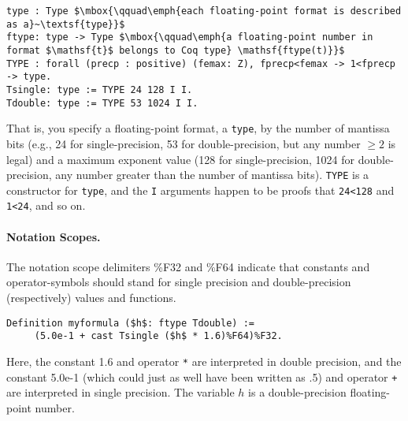 \documentclass{llncs}
\begin{document}
\begin{lstlisting}
type : Type $\mbox{\qquad\emph{each floating-point format is described as a}~\textsf{type}}$
ftype: type -> Type $\mbox{\qquad\emph{a floating-point number in format $\mathsf{t}$ belongs to Coq type} \mathsf{ftype(t)}}$
TYPE : forall (precp : positive) (femax: Z), fprecp<femax -> 1<fprecp -> type.
Tsingle: type := TYPE 24 128 I I.
Tdouble: type := TYPE 53 1024 I I.
\end{lstlisting}

That is, you specify a floating-point format, a \lstinline{type}, by
the number of mantissa bits (e.g., 24 for single-precision, 53 for
double-precision, but any number $\ge 2$ is legal) and a maximum
exponent value (128 for single-precision, 1024 for double-precision,
any number greater than the number of mantissa bits).
\lstinline{TYPE} is a constructor for \lstinline{type}, and the
\lstinline{I} arguments happen to be proofs that \lstinline{24<128}
and \lstinline{1<24}, and so on.

\paragraph{Notation Scopes.}  The notation scope delimiters \%F32 and \%F64 indicate that constants and operator-symbols should stand for single precision and double-precision (respectively) values and functions.
\begin{lstlisting}
Definition myformula ($h$: ftype Tdouble) := 
     (5.0e-1 + cast Tsingle ($h$ * 1.6)%F64)%F32.
\end{lstlisting}
Here, the constant 1.6 and operator \lstinline{*} are
interpreted in double precision,
and the constant 5.0e-1 (which could just as well have been written
as .5) and operator \lstinline{+} are interpreted in single precision.
The variable $h$ is a double-precision floating-point number.
\end{document}
